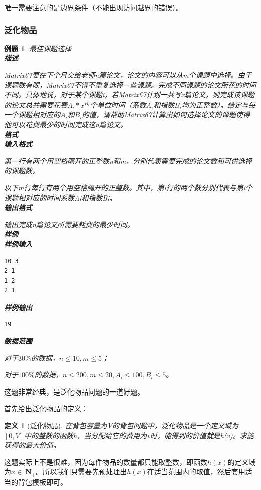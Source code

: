 \documentclass{article}
\newtheorem{example}{例题}[subsection]
\newtheorem{definition}{定义}[subsection]
\theoremstyle{nonumberplain}
\begin{document}
唯一需要注意的是边界条件（不能出现访问越界的错误）。

\subsubsection{泛化物品}
\begin{example}最佳课题选择\ \\
	\textbf{描述}

	Matrix67要在下个月交给老师n篇论文，论文的内容可以从m个课题中选择。由于课题数有限，Matrix67不得不重复选择一些课题。完成不同课题的论文所花的时间不同。具体地说，对于某个课题i，若Matrix67计划一共写x篇论文，则完成该课题的论文总共需要花费$A_i*x^{B_i}$个单位时间（系数$A_i$和指数$B_i$均为正整数）。给定与每一个课题相对应的$A_i$和$B_i$的值，请帮助Matrix67计算出如何选择论文的课题使得他可以花费最少的时间完成这n篇论文。\ \\
	\textbf{格式}\\
	\textbf{输入格式}

	第一行有两个用空格隔开的正整数n和m，分别代表需要完成的论文数和可供选择的课题数。

	以下m行每行有两个用空格隔开的正整数。其中，第i行的两个数分别代表与第i个课题相对应的时间系数Ai和指数Bi。\\
	\textbf{输出格式}

	输出完成n篇论文所需要耗费的最少时间。
	\ \\
	\textbf{样例}\\
	\textbf{样例输入}
	\begin{verbatim}
10 3
2 1
1 2
2 1
\end{verbatim}
	\textbf{样例输出}
	\begin{verbatim}
19
\end{verbatim}
	\textbf{数据范围}

	对于$30\%$的数据，$n\leq10, m\leq5$；

	对于$100\%$的数据，$n\leq200, m\leq20, A_i\leq100, B_i\leq5$。
\end{example}

这题非常经典，是泛化物品问题的一道好题。

首先给出泛化物品的定义：
\begin{definition}[泛化物品]在背包容量为V的背包问题中，泛化物品是一个定义域为$[0,V]$中的整数的函数h，当分配给它的费用为v时，能得到的价值就是h(v)。求能获得的最大价值。
\end{definition}

这题实际上不是很难，因为每件物品的数量都只能取整数，即函数$h(x)$的定义域为$x \in\ $\textbf{N}$_+$。所以我们只需要先预处理出$h(x)$在适当范围内的取值，然后套用适当的背包模板即可。
\end{document}
